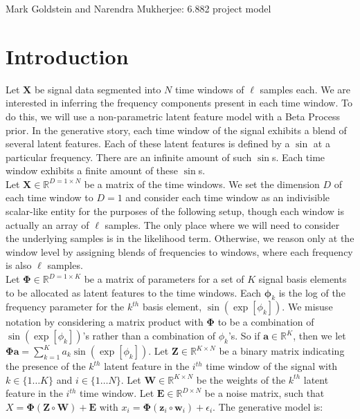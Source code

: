 \documentclass[11pt]{article}
\theoremstyle{definition}
\theoremstyle{plain}
\begin{document}
\begin{center}
Mark Goldstein and Narendra Mukherjee: 6.882 project model 
\end{center}
\section{Introduction}

\noindent Let $\mathbf{X}$ be signal data segmented into $N$ time windows of $\ell$ samples each.
We are interested in inferring the frequency components present in each time window. 
To do this, we will use a non-parametric latent feature model with a Beta Process prior. In the generative story,
each time window of the signal exhibits a blend of several latent features. Each of these latent features is defined by
a $\sin$ at a particular frequency. There are an infinite amount of such $\sin$s. Each time window exhibits a finite amount
of these $\sin$s.\\

\noindent Let $\mathbf{X} \in \mathbb{R}^{D=1 \times N}$ be a matrix of the time windows. 
We set the dimension $D$ of each time window to $D=1$ 
and consider each time window as an indivisible scalar-like entity for the purposes
of the following setup, though each window is actually an array of $\ell$ samples. 
The only place where we will need to consider the underlying samples is in the likelihood term.
Otherwise, we reason only at the window level by assigning blends of frequencies to windows, where
each frequency is also $\ell$ samples.\\

\noindent Let $\mathbf{\Phi} \in \mathbb{R}^{D=1 \times K}$ be a matrix of parameters for a set of $K$ 
signal basis elements to be allocated as latent features to the time windows.
Each $\mathbf{\phi}_k$ is the log of the frequency parameter for the $k^{th}$ basis element, 
$\sin(\exp[\phi_k])$. We misuse notation by considering a matrix product with 
$\boldsymbol{\Phi}$ to be a combination of $\sin(\exp[\phi_k])$'s rather than a combination 
of $\phi_k$'s. So if $\mathbf{a} \in \mathbb{R}^K$, then we let $\boldsymbol{\Phi}\mathbf{a} =
\sum_{k=1}^K a_k \sin(\exp[\phi_k])$. Let $\mathbf{Z} \in \mathbb{R}^{K \times N}$ be a binary matrix 
indicating the presence of the $k^{th}$ latent feature in the $i^{th}$ time window of the signal 
with $k \in \{1 \ldots K\}$ and $i \in \{1 \ldots N\}$. Let $\mathbf{W} \in \mathbb{R}^{K \times N}$ 
be the weights of the $k^{th}$ latent feature in the $i^{th}$ time window. Let $\mathbf{E} 
\in \mathbb{R}^{D \times N}$ be a noise matrix, such that $X = \mathbf{\Phi}(\mathbf{Z} \circ 
\mathbf{W}) + \mathbf{E}$ with $x_i = \mathbf{\Phi}(\mathbf{z}_i \circ \mathbf{w}_i) + \epsilon_i$. 
The generative model is:
\end{document}
